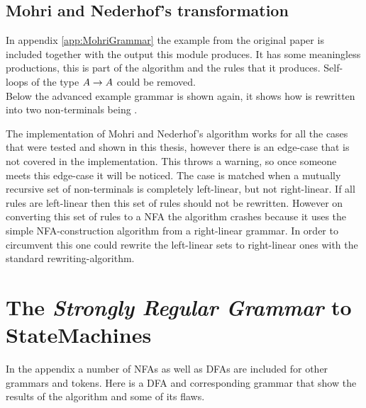 \subsection{Mohri and Nederhof's transformation}
In appendix \ref{app:MohriGrammar} the example from the original paper is included together with the output this module produces. It has some meaningless productions, this is part of the algorithm and the rules that it produces. Self-loops of the type $A \rightarrow A$ could be removed.\\
Below the advanced example grammar is shown again, it shows how  is rewritten into two non-terminals being .

The implementation of Mohri and Nederhof's algorithm works for all the cases that were tested and shown in this thesis, however there is an edge-case that is not covered in the implementation. This throws a warning, so once someone meets this edge-case it will be noticed. The case is matched when a mutually recursive set of non-terminals is completely left-linear, but not right-linear. If all rules are left-linear then this set of rules should not be rewritten. However on converting this set of rules to a NFA the algorithm crashes because it uses the simple NFA-construction algorithm from a right-linear grammar. In order to circumvent this one could rewrite the left-linear sets to right-linear ones with the standard rewriting-algorithm. 




\pagebreak
\section{The \emph{Strongly Regular Grammar} to StateMachines} \label{sec:results:strReg2machines}
In the appendix a number of NFAs as well as DFAs are included for other grammars and tokens. Here is a DFA and corresponding grammar that show the results of the algorithm and some of its flaws. 

